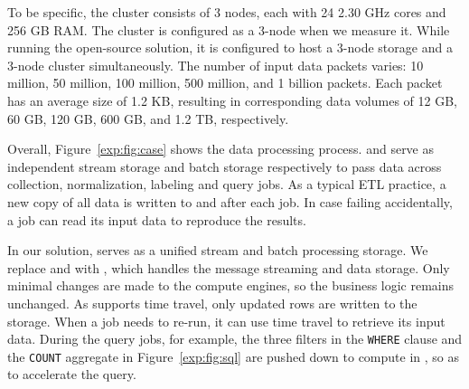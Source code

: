  
  To be specific, the cluster consists of 3 nodes, each with 24  2.30 GHz cores and 256 GB RAM. The cluster is configured as a 3-node \sys when we measure it.  While running the open-source solution, it is configured to host a 3-node \hdfs storage and a 3-node \kafka cluster simultaneously. The number of input data packets varies: 10 million, 50 million, 100 million, 500 million, and 1 billion packets. Each packet has an average size of 1.2 KB, resulting in corresponding data volumes of 12 GB, 60 GB, 120 GB, 600 GB, and 1.2 TB, respectively.

Overall, Figure~\ref{exp:fig:case} shows the data processing process.  \kafka and \hdfs serve as independent stream storage and batch storage respectively to pass data across collection, normalization, labeling and query jobs.
 As a typical ETL practice, a new copy of all data is written to \hdfs and \kafka after each job. In case  failing accidentally, a job can read its input data to reproduce the results.
 
 

 
  In our solution, \sys serves as a unified stream and batch processing storage. 
  We replace \kafka and \hdfs with \sys, which handles the message streaming and data storage. 
  Only minimal changes are made to the compute engines, so the business logic remains unchanged. 
  As \sys supports time travel, only updated rows are written to the storage. When a job needs to re-run, it can use time travel to retrieve its input data.  During the query jobs, for example, the three filters in the \texttt{WHERE} clause and the \texttt{COUNT} aggregate in Figure~\ref{exp:fig:sql} are pushed down to compute in \sys, so as to  accelerate the query.










